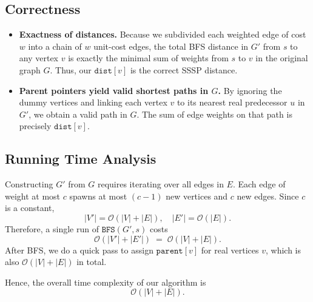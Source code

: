 \documentclass[11pt]{article}
\begin{document}
    \subsection*{Correctness}
    \begin{itemize}
        \item \textbf{Exactness of distances.} Because we subdivided each weighted edge of cost \(w\) into a chain of \(w\) unit-cost edges, the total BFS distance in \(G'\) from \(s\) to any vertex \(v\) is exactly the minimal sum of weights from \(s\) to \(v\) in the original graph \(G\). Thus, our \(\texttt{dist}[v]\) is the correct SSSP distance.
        \item \textbf{Parent pointers yield valid shortest paths in \(G\).} By ignoring the dummy vertices and linking each vertex \(v\) to its nearest real predecessor \(u\) in \(G'\), we obtain a valid path in \(G\). The sum of edge weights on that path is precisely \(\texttt{dist}[v]\).
    \end{itemize}
    
    \subsection*{Running Time Analysis}
    Constructing \(G'\) from \(G\) requires iterating over all edges in \(E\). Each edge of weight at most \(c\) spawns at most \((c-1)\) new vertices and \(c\) new edges. Since \(c\) is a constant,
    \[
      |V'| = \mathcal{O}(|V| + |E|),
      \quad
      |E'| = \mathcal{O}(|E|).
    \]
    Therefore, a single run of \(\texttt{BFS}(G', s)\) costs 
    \[
      \mathcal{O}(|V'| + |E'|) \;=\; \mathcal{O}(|V| + |E|).
    \]
    After BFS, we do a quick pass to assign \(\texttt{parent}[v]\) for real vertices \(v\), which is also \(\mathcal{O}(|V| + |E|)\) in total.
    
    Hence, the overall time complexity of our algorithm is 
    \[
      \mathcal{O}(|V| + |E|).
    \]

    \newpage
    
\end{document}
